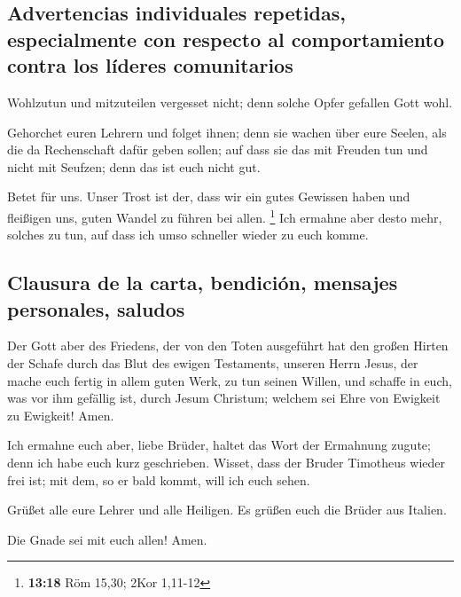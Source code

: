 \hypertarget{advertencias-individuales-repetidas-especialmente-con-respecto-al-comportamiento-contra-los-luxedderes-comunitarios}{%
\subsection{Advertencias individuales repetidas, especialmente con
respecto al comportamiento contra los líderes
comunitarios}\label{advertencias-individuales-repetidas-especialmente-con-respecto-al-comportamiento-contra-los-luxedderes-comunitarios}}

 Wohlzutun und mitzuteilen vergesset nicht; denn solche
Opfer gefallen Gott wohl.

 Gehorchet euren Lehrern und folget ihnen; denn sie
wachen über eure Seelen, als die da Rechenschaft dafür geben sollen; auf
dass sie das mit Freuden tun und nicht mit Seufzen; denn das ist euch
nicht gut.

 Betet für uns. Unser Trost ist der, dass wir ein gutes
Gewissen haben und fleißigen uns, guten Wandel zu führen bei allen.
\footnote{\textbf{13:18} Röm 15,30; 2Kor 1,11-12}  Ich
ermahne aber desto mehr, solches zu tun, auf dass ich umso schneller
wieder zu euch komme.

\hypertarget{clausura-de-la-carta-bendiciuxf3n-mensajes-personales-saludos}{%
\subsection{Clausura de la carta, bendición, mensajes personales,
saludos}\label{clausura-de-la-carta-bendiciuxf3n-mensajes-personales-saludos}}

 Der Gott aber des Friedens, der von den Toten ausgeführt
hat den großen Hirten der Schafe durch das Blut des ewigen Testaments,
unseren Herrn Jesus,  der mache euch fertig in allem
guten Werk, zu tun seinen Willen, und schaffe in euch, was vor ihm
gefällig ist, durch Jesum Christum; welchem sei Ehre von Ewigkeit zu
Ewigkeit! Amen.

 Ich ermahne euch aber, liebe Brüder, haltet das Wort der
Ermahnung zugute; denn ich habe euch kurz geschrieben. 
Wisset, dass der Bruder Timotheus wieder frei ist; mit dem, so er bald
kommt, will ich euch sehen.

 Grüßet alle eure Lehrer und alle Heiligen. Es grüßen
euch die Brüder aus Italien.

 Die Gnade sei mit euch allen! Amen.
